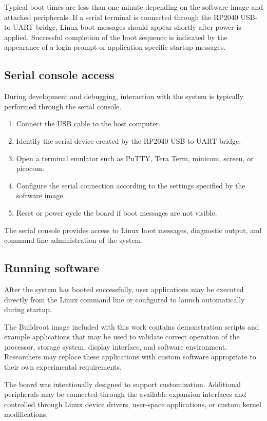 Typical boot times are less than one minute depending on the software image and attached peripherals.
If a serial terminal is connected through the RP2040 USB-to-UART bridge, 
Linux boot messages should appear shortly after power is applied. 
Successful completion of the boot sequence is indicated by the appearance of a 
login prompt or application-specific startup messages.

\subsection{Serial console access}

During development and debugging, interaction with the system is typically 
performed through the serial console.

\begin{enumerate}
\item Connect the USB cable to the host computer.
\item Identify the serial device created by the RP2040 USB-to-UART bridge.
\item Open a terminal emulator such as PuTTY, Tera Term, minicom, screen, or picocom.
\item Configure the serial connection according to the settings specified by the software image.
\item Reset or power cycle the board if boot messages are not visible.
\end{enumerate}

The serial console provides access to Linux boot messages, diagnostic output, 
and command-line administration of the system.

\subsection{Running software}

After the system has booted successfully, user applications may be executed 
directly from the Linux command line or configured to launch automatically 
during startup.

The Buildroot image included with this work contains demonstration scripts 
and example applications that may be used to validate correct operation of 
the processor, storage system, display interface, and software environment. 
Researchers may replace these applications with custom software appropriate 
to their own experimental requirements.

The board was intentionally designed to support customization. Additional 
peripherals may be connected through the available expansion interfaces and 
controlled through Linux device drivers, user-space applications, or custom 
kernel modifications.

